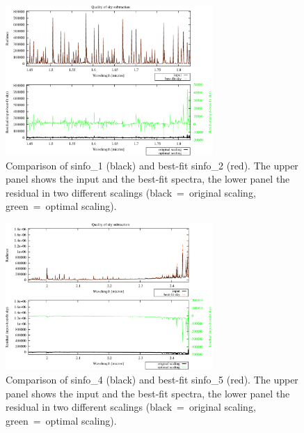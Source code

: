 \begin{figure}
\centering
\includegraphics[width=0.7\textwidth,clip=true]{figures/TEST-SINFO-H_fit.pdf}
\caption[]{Comparison of sinfo\_1 (black) and best-fit sinfo\_2 (red). The
upper panel shows the input and the best-fit spectra, the lower panel the
residual in two different scalings (black~=~original scaling, green~=~optimal
scaling).}
\label{fig:sinfo_H}
\end{figure}

\begin{figure}
\centering
\includegraphics[width=0.7\textwidth,clip=true]{figures/TEST-SINFO-K_fit.pdf}
\caption[]{Comparison of sinfo\_4 (black) and best-fit sinfo\_5 (red). The
upper panel shows the input and the best-fit spectra, the lower panel the
residual in two different scalings (black~=~original scaling, green~=~optimal
scaling).}
\label{fig:sinfo_K}
\end{figure}

